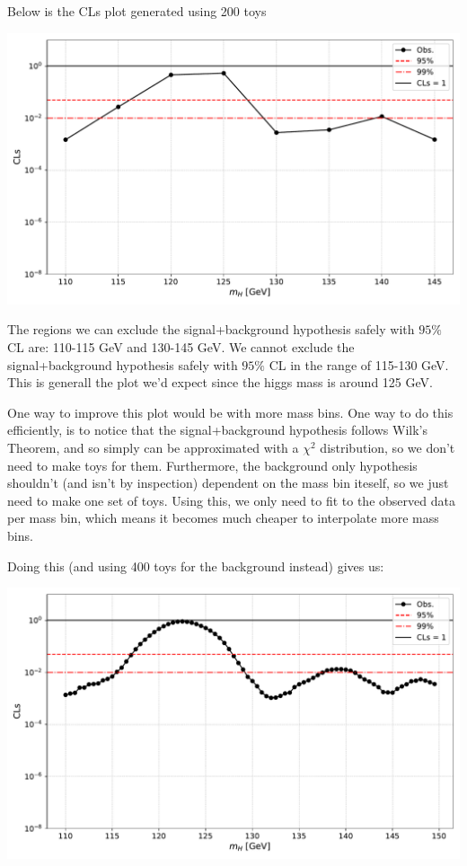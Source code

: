 \documentclass{6042}
\begin{document}

Below is the CLs plot generated using 200 toys

\begin{center}
    \includegraphics[scale=0.5]{images/cls_small_nsig22/cls_plot.pdf}
\end{center}


The regions we can exclude the signal+background hypothesis safely with $95\%$ CL are: 110-115 GeV and 130-145 GeV. We cannot exclude the signal+background hypothesis safely with $95\%$ CL in the range of 115-130 GeV. This is generall the plot we'd expect since the higgs mass is around 125 GeV. 

One way to improve this plot would be with more mass bins. One way to do this efficiently, is to notice that the signal+background hypothesis follows Wilk's Theorem, and so simply can be approximated with a $\chi^2$ distribution, so we don't need to make toys for them. Furthermore, the background only hypothesis shouldn't (and isn't by inspection) dependent on the mass bin iteself, so we just need to make one set of toys. Using this, we only need to fit to the observed data per mass bin, which means it becomes much cheaper to interpolate more mass bins. 

Doing this (and using 400 toys for the background instead) gives us:

\includegraphics[scale=0.5]{images/clsEnhanced_small_nsig22/cls_plot.pdf}
\end{document}
